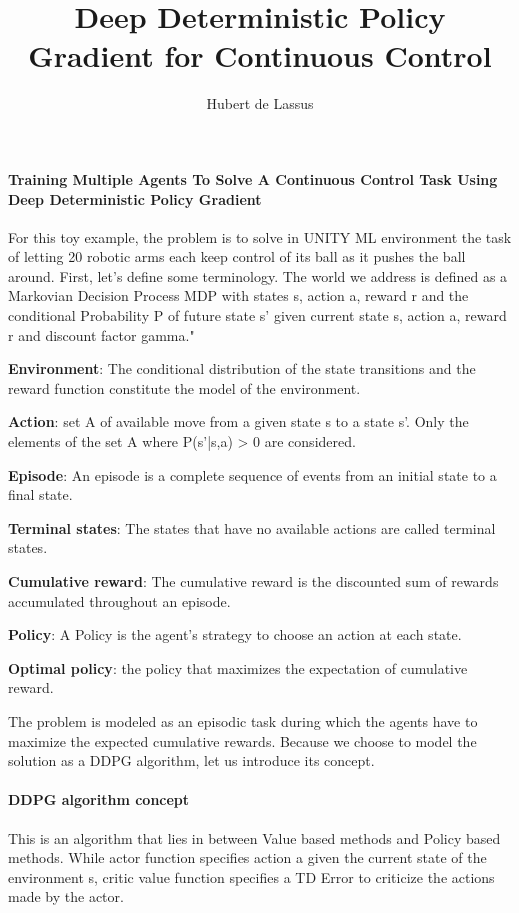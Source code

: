 \documentclass[11pt]{amsart}
\title{Deep Deterministic Policy Gradient for Continuous Control}
\author{Hubert de Lassus}
\begin{document}
\maketitle
\paragraph{\textbf{Training Multiple Agents To Solve A Continuous Control Task Using Deep Deterministic Policy Gradient}}

\begin{flushleft}

For this toy example, the problem is to solve in UNITY ML environment the task of letting 20 robotic arms each keep control of its ball as it pushes the ball around.
First, let's define some terminology.
The world we address is defined as a Markovian Decision Process MDP with states s, action a, reward r and the conditional Probability P
of future state s' given current state s, action a, reward r and discount factor gamma."
\end{flushleft}

\textbf{Environment}: The conditional distribution of the state transitions and the reward function constitute the model of the environment.

\textbf{Action}: set A of available move from a given state s to a state s'. Only the elements of the set A where P(s'|s,a) > 0 are considered. 

\textbf{Episode}: An episode is a complete sequence of events from an initial state to a final state.

\textbf{Terminal states}: The states that have no available actions are called terminal states.

\textbf{Cumulative reward}: The cumulative reward is the discounted sum of rewards accumulated throughout an episode.

\textbf{Policy}: A Policy is the agent’s strategy to choose an action at each state.

\textbf{Optimal policy}: the policy that maximizes the expectation of cumulative reward.

The problem is modeled as an episodic task during which the agents have to maximize the expected cumulative rewards.
Because we choose to model the solution as a DDPG algorithm, let us introduce its concept.
\paragraph{\textbf{DDPG algorithm concept}}
This is an algorithm that lies in between Value based methods and Policy based methods.
While actor function  specifies action a given the current state of the environment s, critic value function specifies a TD Error to criticize the actions made by the actor.
\end{document}
